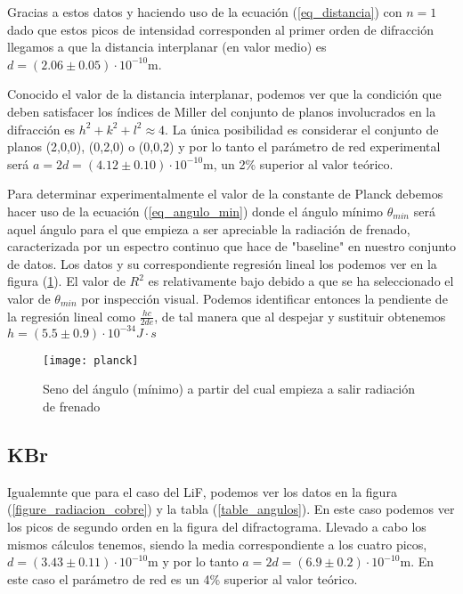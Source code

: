Gracias a estos datos y haciendo uso de la ecuación (\ref{eq_distancia}) con $n=1$ dado que estos picos de intensidad corresponden al primer orden de difracción llegamos a que la distancia interplanar (en valor medio) es $d = (2.06 \pm 0.05)\cdot 10^{-10}$m. 

Conocido el valor de la distancia interplanar, podemos ver que la condición que deben satisfacer los índices de Miller del conjunto de planos involucrados en la difracción es $ h^2 + k^2 + l^2 \approx 4$. La única posibilidad es considerar el conjunto de planos (2,0,0), (0,2,0) o (0,0,2) y por lo tanto el parámetro de red experimental será $a = 2d = (4.12 \pm 0.10)\cdot 10^{-10}$m, un 2\% superior al valor teórico.

Para determinar experimentalmente el valor de la constante de Planck debemos hacer uso de la ecuación (\ref{eq_angulo_min}) donde el ángulo mínimo $\theta_{min}$ será aquel ángulo para el que empieza a ser apreciable la radiación de frenado, caracterizada por un espectro continuo que hace de "baseline" en nuestro conjunto de datos. Los datos y su correspondiente regresión lineal los podemos ver en la figura (\ref{figure_planck}). El valor de $R^2$ es relativamente bajo debido a que se ha seleccionado el valor de $\theta_{min}$ por inspección visual. Podemos identificar entonces la pendiente de la regresión lineal como $\frac{hc}{2de}$, de tal manera que al despejar y sustituir obtenemos $h = (5.5 \pm 0.9)\cdot 10^{-34} J \cdot s$

\begin{figure}[H]
	\texttt{[image: planck]}
	\caption{Seno del ángulo (mínimo) a partir del cual empieza a salir radiación de frenado}
	\label{figure_planck}
\end{figure}

\subsection{KBr}

Igualemnte que para el caso del LiF, podemos ver los datos en la figura (\ref{figure_radiacion_cobre}) y la tabla (\ref{table_angulos}). En este caso podemos ver los picos de segundo orden en la figura del difractograma. Llevado a cabo los mismos cálculos tenemos, siendo la media correspondiente a los cuatro picos, $d = (3.43 \pm 0.11)\cdot 10^{-10}$m y por lo tanto $a = 2d = (6.9 \pm 0.2)\cdot 10^{-10}$m. En este caso el parámetro de red es un 4\% superior al valor teórico.
